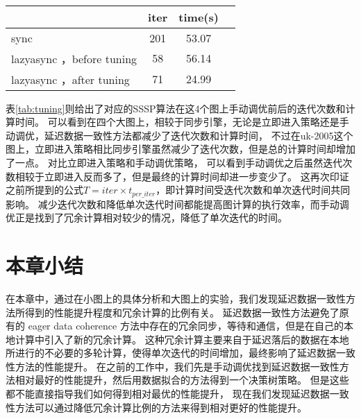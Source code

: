 \begin{table}[!htbp]
\begin{subtable}[t]{0.45\textwidth}
  \end{subtable}
  ~%
  \begin{subtable}[t]{0.45\textwidth}
      \centering
      \label{tab:sample_4}
      \begin{tabular}{lccc}
          \hline
          & iter  & time(s) \\
          \hline
          sync & 201 & 53.07 \\
          \hline
          lazyasync ，before tuning & 58 & 56.14 \\
          \hline
          lazyasync ，after tuning & 71 & 24.99 \\
          \hline
      \end{tabular}
  \end{subtable}
\end{table}
表\ref{tab:tuning}则给出了对应的SSSP算法在这4个图上手动调优前后的迭代次数和计算时间。
可以看到在四个大图上，相较于同步引擎，无论是立即进入策略还是手动调优，延迟数据一致性方法都减少了迭代次数和计算时间，
不过在uk-2005这个图上，立即进入策略相比同步引擎虽然减少了迭代次数，但是总的计算时间却增加了一点。
对比立即进入策略和手动调优策略， 可以看到手动调优之后虽然迭代次数相较于立即进入反而多了，但是最终的计算时间却进一步变少了。
这再次印证之前所提到的公式$T=iter \times t_{per\_iter}$，即计算时间受迭代次数和单次迭代时间共同影响。
减少迭代次数和降低单次迭代时间都能提高图计算的执行效率，而手动调优正是找到了冗余计算相对较少的情况，降低了单次迭代的时间。



\section{本章小结}
在本章中，通过在小图上的具体分析和大图上的实验，我们发现延迟数据一致性方法所得到的性能提升程度和冗余计算的比例有关。
延迟数据一致性方法避免了原有的 eager data coherence 方法中存在的冗余同步，等待和通信，但是在自己的本地计算中引入了新的冗余计算。
这种冗余计算主要来自于延迟落后的数据在本地所进行的不必要的多轮计算，使得单次迭代的时间增加，最终影响了延迟数据一致性方法的性能提升。
在之前的工作中，我们先是手动调优找到延迟数据一致性方法相对最好的性能提升，然后用数据拟合的方法得到一个决策树策略。
但是这些都不能直接指导我们如何得到相对最优的性能提升，
现在我们发现延迟数据一致性方法可以通过降低冗余计算比例的方法来得到相对更好的性能提升。
